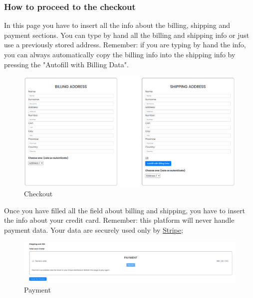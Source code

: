 \subsubsection{How to proceed to the checkout} \label{_checkout}
In this page you have to insert all the info about the billing, shipping and payment sections.
You can type by hand all the billing and shipping info or just use a previously stored address.
Remember: if you are typing by hand the info, you can always automatically copy the billing info into the shipping info by pressing the "Autofill with Billing Data".
\begin{figure}[H]
    \centering
    \includegraphics[width=\linewidth]{res/images/cliente/checkout.png}
    \caption{Checkout}
\end{figure}
Once you have filled all the field about billing and shipping, you have to insert the info about your credit card.
Remember: this platform will never handle payment data. Your data are securely used only by \href{https://stripe.com}{Stripe}; 
\begin{figure}[H]
    \centering
    \includegraphics[width=\linewidth]{res/images/cliente/payment.png}
    \caption{Payment}
\end{figure}

